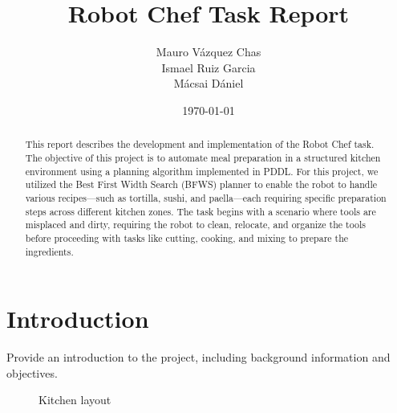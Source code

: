 \documentclass[a4paper,12pt]{article}
\title{Robot Chef Task Report}
\author{Mauro Vázquez Chas \\
Ismael Ruiz Garcia \\
Mácsai Dániel
}
\date{\today}
\begin{document}
\maketitle

\begin{abstract}
    This report describes the development and implementation of the Robot Chef task. The objective of this project is to automate meal preparation in a structured kitchen environment using a planning algorithm implemented in PDDL. For this project, we utilized the Best First Width Search (BFWS) planner to enable the robot to handle various recipes—such as tortilla, sushi, and paella—each requiring specific preparation steps across different kitchen zones. The task begins with a scenario where tools are misplaced and dirty, requiring the robot to clean, relocate, and organize the tools before proceeding with tasks like cutting, cooking, and mixing to prepare the ingredients.
\end{abstract}

\newpage
\tableofcontents
\newpage

\section{Introduction}
\label{sec:introduction}
Provide an introduction to the project, including background information and objectives.
\begin{wrapfigure}{r}{0.5\textwidth}
    \centering
    \caption{Kitchen layout}
    \label{fig:kitchen_layout}
\end{wrapfigure}
\end{document}
